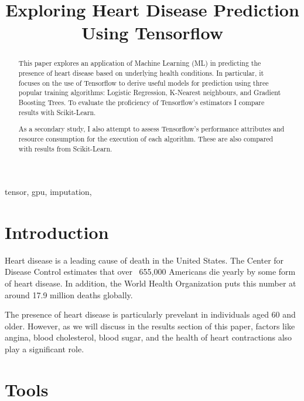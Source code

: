 \documentclass[conference]{IEEEtran}
\begin{document}
\title{Exploring Heart Disease Prediction Using Tensorflow} 

\author{
}

\maketitle

\begin{abstract}
This paper explores an application of Machine Learning (ML) in predicting the presence of heart disease based on underlying health conditions. In particular, it focuses on the use of Tensorflow to derive useful models for prediction using three popular training algorithms: Logistic Regression, K-Nearest neighbours, and Gradient Boosting Trees. To evaluate the proficiency of Tensorflow's estimators I compare results with Scikit-Learn.

As a secondary study, I also attempt to assess Tensorflow's performance attributes and resource consumption for the execution of each algorithm. These are also compared with results from Scikit-Learn.
\end{abstract}

\begin{IEEEkeywords}
tensor, gpu, imputation, 
\end{IEEEkeywords}

\section{Introduction}
Heart disease is a leading cause of death in the United States. The Center for Disease Control estimates that over ~655,000 Americans die yearly by some form of heart disease\cite{b1}. In addition, the World Health Organization puts this number at around 17.9 million deaths globally\cite{b2}.  

The presence of heart disease is particularly prevelant in individuals aged 60 and older. However, as we will discuss in the results section of this paper, factors like angina, blood cholesterol, blood sugar, and the health of heart contractions also play a significant role.

\section{Tools}
\end{document}
